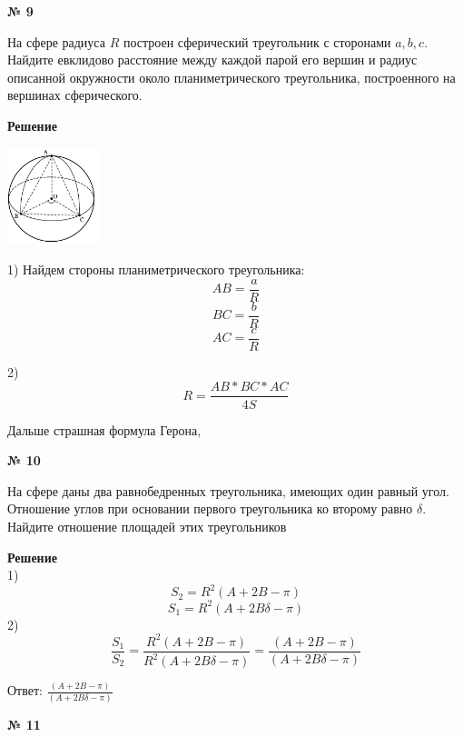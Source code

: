     \begin{center}
        \textbf{№ 9}
    \end{center}

    На сфере радиуса $R$ построен сферический треугольник с сторонами $a, b, c$.
    Найдите евклидово расстояние между каждой парой его вершин и радиус описанной окружности
    около планиметрического треугольника, построенного на вершинах сферического.

    \textbf{Решение}\\

    \begin{center}
        \includegraphics[width=0.2\textwidth]{images/img8}\\
    \end{center}

    1) Найдем стороны планиметрического треугольника:
    \[
        AB = \frac{a}{R}
    \]
    \[
        BC = \frac{b}{R}
    \]
    \[
        AC = \frac{c}{R}
    \]

    2) \[
           R = \frac{AB * BC * AC}{4S}
    \]

    Дальше страшная формула Герона,


    \begin{center}
        \textbf{№ 10}
    \end{center}

    На сфере даны два равнобедренных треугольника, имеющих один равный угол.
    Отношение углов при основании первого треугольника ко второму равно $\delta$.
    Найдите отношение площадей этих треугольников

    \textbf{Решение}\\

    1)
    \[
        S_2 = R ^ 2(A + 2B - \pi)
    \]
    \[
        S_1 = R^2(A + 2B\delta - \pi)
    \]
    2)
    \[
        \frac{S_1}{S_2} = \frac{R ^ 2(A + 2B - \pi)}{R ^ 2(A + 2B\delta - \pi)} = \frac{(A + 2B - \pi)}{(A + 2B\delta - \pi)}
    \]

    Ответ: $\frac{(A + 2B - \pi)}{(A + 2B\delta - \pi)}$

    \begin{center}
        \textbf{№ 11}
    \end{center}


